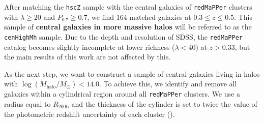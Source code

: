 \documentclass[a4paper,fleqn,usenatbib]{mnras}
\def\arcsec{{\prime\prime}}
\def\redm{\texttt{redMaPPer}}
\def\rbcg{\texttt{cenHighMh}}
\def\mhalo{{$M_{\mathrm{halo}}$}}
\def\logms{{$\log (M_{\star}/M_{\odot})$}}
\def\logmh{{$\log (M_{\mathrm{halo}}/M_{\odot})$}}
\begin{document}
    
    

 
    After matching the \texttt{hscZ} sample with the central galaxies of \redm{} 
    clusters with $\lambda \geq 20$ and $P_{\mathrm{0.7}} \geq 0.7$, we find 164 
    matched galaxies at $0.3 \leq z \leq 0.5$.
    This sample of \textbf{central galaxies in more massive halos} will be referred to 
    as the \rbcg{} sample. 
    Due to the depth and resolution of SDSS, the \redm{} catalog becomes slightly 
    incomplete at lower richness ($\lambda < 40$) at $z > 0.33$, but the main results 
    of this work are not affected by this.
    
    As the next step, we want to construct a sample of central galaxies living in halos 
    with \logmh{}$<14.0$. 
    To achieve this, we identify and remove all galaxies within a cylindrical region 
    around all \redm{} clusters. 
    We use a radius equal to $R_{\mathrm{200b}}$ and the thickness of the cylinder is 
    set to twice the value of the photometric redshift uncertainty of each cluster ().
    
\end{document}
